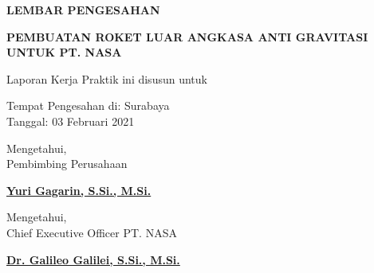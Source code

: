 \begin{center}
  {\Large \textbf{LEMBAR PENGESAHAN}}
  \vspace{6ex}


  {\large \textbf{PEMBUATAN ROKET LUAR ANGKASA ANTI GRAVITASI UNTUK PT. NASA}}
  \vspace{6ex}

  Laporan Kerja Praktik ini disusun untuk \lipsum[1][1]
  \vspace{2ex}

  Tempat Pengesahan di: Surabaya \\
  Tanggal: 03 Februari 2021
  \vspace{8ex}

  Mengetahui, \\
  Pembimbing Perusahaan
  \vspace{12ex}

  \textbf{\underline{Yuri Gagarin, S.Si., M.Si.}}
  \vspace{8ex}

  Mengetahui, \\
  Chief Executive Officer PT. NASA
  \vspace{12ex}

  \textbf{\underline{Dr. Galileo Galilei, S.Si., M.Si.}}

\end{center}
